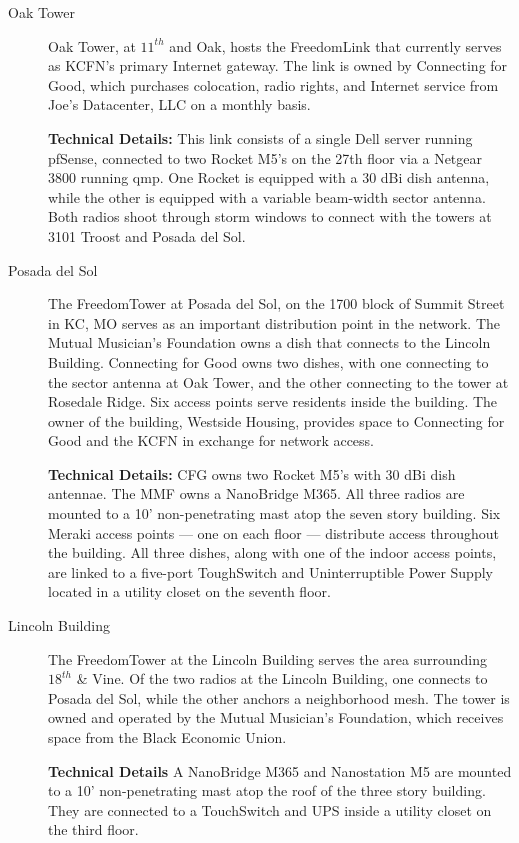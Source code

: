 \begin{description}
\item[Oak Tower]
Oak Tower, at $11^{th}$ and Oak, hosts the FreedomLink that currently serves as
KCFN's primary Internet gateway. The link is owned by Connecting
for Good, which purchases colocation, radio rights, and Internet service from
Joe's Datacenter, LLC on a monthly basis. \par
{\bf Technical Details:} This link consists of a single Dell server running
pfSense, connected to two Rocket M5's 
on the 27th floor via a Netgear 3800 running qmp. One Rocket is equipped with a
30 dBi dish antenna, while the other is equipped with a variable beam-width
sector antenna. Both radios shoot through storm 
windows to connect with the towers at 3101 Troost and Posada del Sol.

\item[Posada del Sol]
The FreedomTower at Posada del Sol, on the 1700 block of Summit Street in KC, MO
serves as an important distribution point in the network. The Mutual Musician's Foundation owns a dish that
connects to the Lincoln Building. Connecting for Good owns two dishes, with
one connecting to the sector antenna at Oak Tower, and the other connecting to the tower at
Rosedale Ridge. Six access points serve residents inside the building. The owner
of the building, Westside Housing, provides space to Connecting for Good and the
KCFN in exchange for network access. \par
{\bf Technical Details:} CFG owns two Rocket M5's with 30 dBi dish antennae. The
MMF owns a NanoBridge M365. All three radios are mounted to a 10'
non-penetrating mast atop the seven story building. Six Meraki access points ---
one on each floor --- distribute access throughout the building.  All three dishes, along with
one of the indoor access points, are linked to a five-port ToughSwitch and 
Uninterruptible Power Supply located in a utility closet on the seventh floor.

\item[Lincoln Building]
The FreedomTower at the Lincoln Building serves the area surrounding $18^{th}$
\& Vine. Of the two radios at the Lincoln Building, one connects to Posada del
Sol, while the other anchors a neighborhood mesh. The tower is owned and operated by the Mutual Musician's Foundation, which
receives space from the Black Economic Union. \par
{\bf Technical Details} A NanoBridge M365 and Nanostation M5 are mounted to a 10' non-penetrating
mast atop the roof of the three story building. They are connected to a
TouchSwitch 
and UPS inside a utility closet on the third floor.


\end{description}
